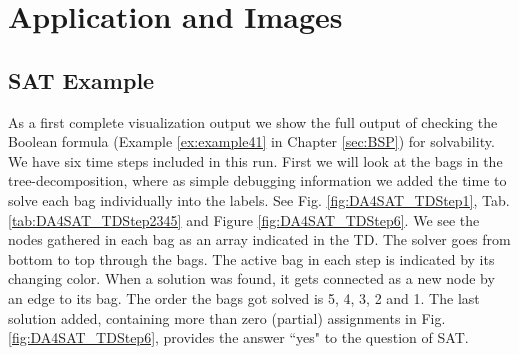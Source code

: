 \documentclass[a4paper, 12pt, bibliography=totoc]{scrartcl}
\begin{document}
\newpage
\section{Application and Images}\label{sec:appl}

\subsection{SAT Example}\label{sec:applsat}
As a first complete visualization output we show the full output of checking the Boolean formula (Example \ref{ex:example41} in Chapter \ref{sec:BSP}) for solvability. We have six time steps included in this run. First we will look at the bags in the tree-decomposition, where as simple debugging information we added the time to solve each bag individually into the labels. See Fig. \ref{fig:DA4SAT_TDStep1}, Tab. \ref{tab:DA4SAT_TDStep2345} and Figure \ref{fig:DA4SAT_TDStep6}.  We see the nodes gathered in each bag as an array indicated in the TD. The solver goes from bottom to top through the bags. The active bag in each step is indicated by its changing color. When a solution was found, it gets connected as a new node by an edge to its bag. The order the bags got solved is 5, 4, 3, 2 and 1. The last solution added, containing more than zero (partial) assignments in Fig. \ref{fig:DA4SAT_TDStep6}, provides the answer ``yes" to the question of SAT.
\end{document}
